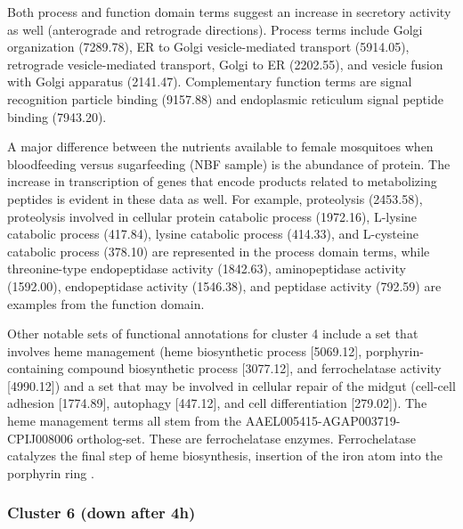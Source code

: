 Both process and function domain terms suggest an increase in secretory activity as well (anterograde and retrograde directions).
%
Process terms include Golgi organization (7289.78), ER to Golgi vesicle-mediated transport (5914.05), retrograde vesicle-mediated transport, Golgi to ER (2202.55), and vesicle fusion with Golgi apparatus (2141.47).
%
Complementary function terms are signal recognition particle binding (9157.88) and endoplasmic reticulum signal peptide binding (7943.20).

A major difference between the nutrients available to female mosquitoes when bloodfeeding versus sugarfeeding (\gls{NBF} sample) is the abundance of protein.
%
The increase in transcription of genes that encode products related to metabolizing peptides is evident in these data as well.
%
For example, proteolysis (2453.58), proteolysis involved in cellular protein catabolic process (1972.16), L-lysine catabolic process (417.84), lysine catabolic process (414.33), and L-cysteine catabolic process (378.10) are represented in the process domain terms, while threonine-type endopeptidase activity (1842.63), aminopeptidase activity (1592.00), endopeptidase activity (1546.38), and peptidase activity (792.59) are examples from the function domain.

Other notable sets of functional annotations for cluster 4 include a set that involves heme management (heme biosynthetic process [5069.12], porphyrin-containing compound biosynthetic process [3077.12], and ferrochelatase activity [4990.12]) and a set that may be involved in cellular repair of the midgut (cell-cell adhesion [1774.89], autophagy [447.12], and cell differentiation [279.02]).
%
The heme management terms all stem from the AAEL005415-AGAP003719-CPIJ008006 ortholog-set.
%
These are ferrochelatase enzymes.
%
Ferrochelatase catalyzes the final step of heme biosynthesis, insertion of the iron atom into the porphyrin ring \cite{Layer2010}.
%








\subsubsection{Cluster 6 (down after 4h)}

